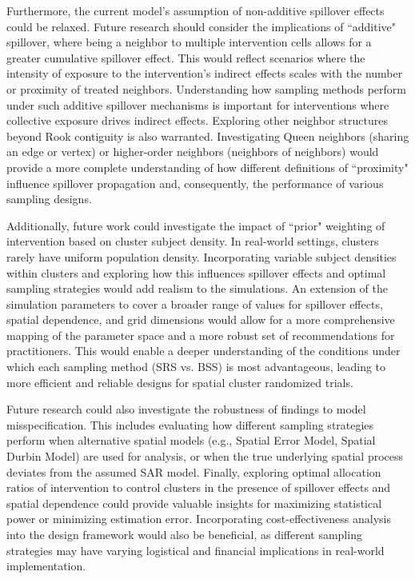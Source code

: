 \documentclass{article}[11pt]
\begin{document}
Furthermore, the current model's assumption of non-additive spillover effects could be
relaxed. Future research should consider the implications of ``additive" spillover, where
being a neighbor to multiple intervention cells allows for a greater cumulative spillover effect.
This would reflect scenarios where the intensity of exposure to the intervention's indirect
effects scales with the number or proximity of treated neighbors. Understanding how
sampling methods perform under such additive spillover mechanisms is important for
interventions where collective exposure drives indirect effects. Exploring other neighbor structures beyond Rook contiguity is also warranted. Investigating Queen neighbors (sharing an edge or vertex) or higher-order neighbors (neighbors of
neighbors) would provide a more complete understanding of how different definitions of
``proximity" influence spillover propagation and, consequently, the performance of various
sampling designs.

Additionally, future work could investigate the impact of ``prior" weighting of intervention
based on cluster subject density. In real-world settings, clusters rarely have uniform
population density. Incorporating variable subject densities within clusters and exploring how
this influences spillover effects and optimal sampling strategies would add realism to the
simulations. An extension of the simulation parameters to cover a broader range of values for spillover
effects, spatial dependence, and grid dimensions would allow for a more comprehensive mapping of the
parameter space and a more robust set of recommendations for practitioners. This would
enable a deeper understanding of the conditions under which each sampling method (SRS vs.
BSS) is most advantageous, leading to more efficient and reliable designs for spatial cluster
randomized trials.

Future research could also investigate the robustness of findings to model
misspecification. This includes evaluating how different sampling strategies perform when
alternative spatial models (e.g., Spatial Error Model, Spatial Durbin Model) are used for
analysis, or when the true underlying spatial process deviates from the assumed SAR model. Finally, exploring optimal allocation ratios of intervention to control clusters in the presence of spillover effects and spatial dependence could provide valuable insights for maximizing statistical power or minimizing estimation error. Incorporating cost-effectiveness analysis into the design framework would also be beneficial, as different sampling strategies may have varying logistical and financial implications in real-world implementation.
\end{document}
